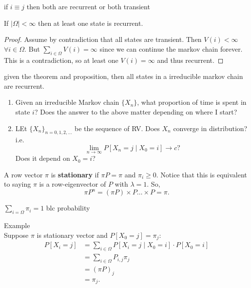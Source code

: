 \documentclass[a4paper]{article}
\begin{document}
\begin{theorem}
  if $i \equiv j$ then both are recurrent or both transient  
\end{theorem}


\begin{prop}
  If $\mid \Omega \mid  < \infty$ then at least one state is recurrent.

  \begin{proof} 
    Assume by contradiction that all states are transient. Then $V(i) < \infty$ $\forall i \in \Omega$. But  $\sum_{i \in \Omega} V(i) = \infty$ since we can continue the markov chain forever. This is a contradiction, so at least one $V(i) = \infty$ and thus recurrent.
  \end{proof}
\end{prop}

\begin{corollary}
  given the theorem and proposition, then all states in a irreducible markov chain are recurrent.
\end{corollary}

\begin{note}
\begin{enumerate}
  \item Given an irreducible Markov chain $\{X_n\} $, what proportion of time is spent in state $i$? Does the answer to the above matter depending on where I start?
  \item LEt $\{X_n\}_{n =0,1,2,\ldots} $ be the sequence of RV. Does $X_n$ converge in distribution? i.e. 
     \[
       \lim_{n \to \infty} P[X_n=j \mid X_0=i] \to c
    ?\] Does it depend on $X_0=i$?
\end{enumerate} 
\end{note}

\begin{definition}
  A row vector $\pi$ is \textbf{stationary} if  $\pi P = \pi$ and $\pi_{i} \geq 0$. Notice that this is equivalent to saying
  $\pi$ is a row-eigenvector of $P$ with  $\lambda = 1$.  So,
  \[
  \pi P^{n} = (\pi P) \times P \ldots \times P = \pi
  .\] 
\begin{remark}
  $\sum_{i=\Omega} \pi_i = 1$ blc probability
\end{remark}
\end{definition}

\begin{note}{Example}\\
  Suppose $\pi$ is stationary vector and $P[X_0 =j] = \pi_j$:
  \begin{align*}
    P[X_i=j] &= \sum_{i \in \Omega} P[X_i =j \mid X_0 =i] \cdot P[X_0 = i]\\
             &= \sum_{i \in \Omega} P_{i,j} \pi_j \\
             &= (\pi P)_{j} \\
             &= \pi_{j}
  .\end{align*}
\end{note}
\end{document}
